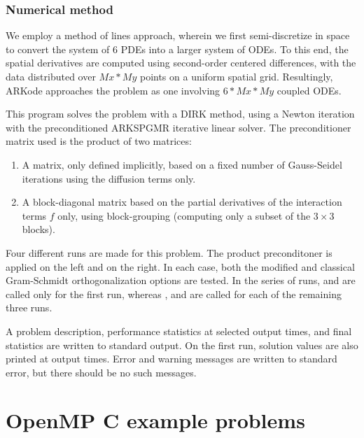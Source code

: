 \documentclass[letterpaper,10pt,english]{sphinxmanual}
\begin{document}
\subsection{Numerical method}
\label{c_serial:id31}
We employ a method of lines approach, wherein we first
semi-discretize in space to convert the system of 6 PDEs into a larger
system of ODEs.  To this end, the spatial derivatives are computed
using second-order centered differences, with the data distributed
over $Mx*My$ points on a uniform spatial grid.  Resultingly, ARKode
approaches the problem as one involving $6*Mx*My$ coupled ODEs.

This program solves the problem with a DIRK method, using a Newton
iteration with the preconditioned ARKSPGMR iterative linear solver.
The preconditioner matrix used is the product of two matrices:
\begin{enumerate}
\item {} 
A matrix, only defined implicitly, based on a fixed number of
Gauss-Seidel iterations using the diffusion terms only.

\item {} 
A block-diagonal matrix based on the partial derivatives of the
interaction terms $f$ only, using block-grouping (computing
only a subset of the $3\times3$ blocks).

\end{enumerate}

Four different runs are made for this problem.  The product
preconditoner is applied on the left and on the right.  In each case,
both the modified and classical Gram-Schmidt orthogonalization options
are tested.  In the series of runs,  and 
are called only for the first run, whereas ,
 and  are called for each
of the remaining three runs.

A problem description, performance statistics at selected output
times, and final statistics are written to standard output.  On the
first run, solution values are also printed at output times.  Error
and warning messages are written to standard error, but there should
be no such messages.


\chapter{OpenMP C example problems}
\label{c_openmp:openmp-c}\label{c_openmp::doc}\label{c_openmp:openmp-c-example-problems}
\end{document}
